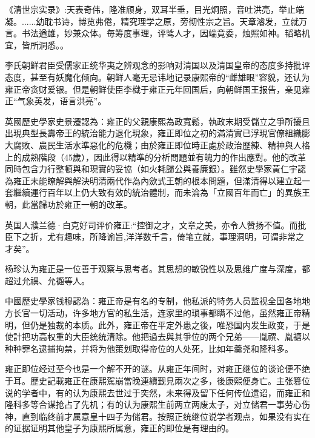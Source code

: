 《清世宗实录》:天表奇伟，隆准颀身，双耳半垂，目光炯照，音吐洪亮，举止端凝。......幼耽书诗，博览弗倦，精究理学之原，旁彻性宗之旨。天章濬发，立就万言。书法遒雄，妙兼众体。毎筹度事理，评骘人才，因端竟委，烛照如神。韬略机宜，皆所洞悉。。

李氏朝鲜君臣受儒家正统华夷之辨观念的影响对清国以及清国皇帝的态度多持批评态度，甚至有妖魔化倾向。朝鲜人毫无忌讳地记录康熙帝的“雌雄眼”容貌，还认为雍正帝贪财爱银。但是朝鲜使臣李樴于雍正元年回国后，向朝鲜国王报告，亲见雍正“气象英发，语言洪亮”。

英國歷史學家史景遷認為：雍正的父親康熙為政寬鬆，執政末期受儲立之爭所擾且出現典型長壽帝王的統治能力退化現象，雍正即位之初的滿清實已浮現官僚組織膨大腐敗、農民生活水準惡化的危機；由於雍正即位時正處於政治歷練、精神與人格上的成熟階段（45歲），因此得以精準的分析問題並有魄力的作出應對。他的改革同時包含力行整頓與和現實的妥協（如火耗歸公與養廉銀）。雖然史學家黃仁宇認為雍正未能瞭解與解決明清兩代作為內歛式王朝的根本問題，但滿清得以建立起一套繼續運行百年以上仍大致有效的統治體制，而未淪為「立國百年而亡」的異族王朝，此當歸功於雍正一朝的改革。

英国人濮兰德·白克好司评价雍正:“控御之才，文章之美，亦令人赞扬不值。而批臣下之折，尤有趣味，所降谕旨,洋洋数千言，倚笔立就，事理洞明，可谓非常之才矣”。

杨珍认为雍正是一位善于观察与思考者。其思想的敏锐性以及思维广度与深度，都超过允禩、允禵等人。

中國歷史學家钱穆認為：雍正帝是有名的专制，他私派的特务人员监视全国各地地方长官一切活动，许多地方官的私生活，连家里的琐事都瞒不过他，虽然雍正帝精明，但仍是独裁的本质。此外，雍正帝在平定外患之後，唯恐国内发生政变，于是使計把功高权重的大臣统统清除。他把過去與其爭位的两个兄弟——胤禩、胤禟以种种罪名逮捕拘禁，并将为他策划取得帝位的人处死，比如年羹尧和隆科多。

雍正即位经过至今也是一个解不开的谜。从雍正年间时，对雍正继位的谈论便不绝于耳。歷史記載雍正在康熙駕崩當晚連續觐見兩次之多，後康熙便身亡。主张篡位说的学者中，有的认为康熙去世过于突然，未来得及留下任何传位遗诏，而雍正和隆科多等合谋抢占了先机；有的认为康熙生前两立两废太子，对立储君一事劳心伤神，直到临终前才属意皇十四子为储君。按照正统继位说学者观点，如果没有实在的证据证明其他皇子为康熙所属意，雍正的即位是有理由的。

